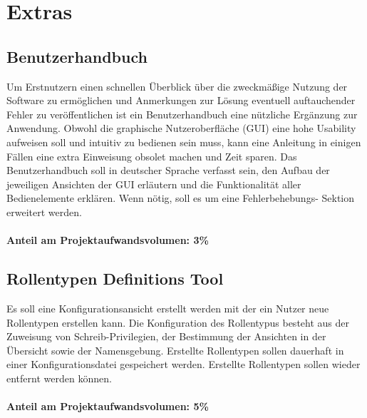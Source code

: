 \section{Extras}
    \subsection{Benutzerhandbuch}

    Um Erstnutzern einen schnellen Überblick über die zweckmäßige Nutzung der
    Software zu ermöglichen und Anmerkungen zur Lösung eventuell auftauchender
    Fehler zu veröffentlichen ist ein Benutzerhandbuch eine nützliche Ergänzung
    zur Anwendung. Obwohl die graphische Nutzeroberfläche (GUI) eine hohe
    Usability aufweisen soll und intuitiv zu bedienen sein muss, kann eine
    Anleitung in einigen Fällen eine extra Einweisung obsolet machen und Zeit
    sparen. Das Benutzerhandbuch soll in deutscher Sprache verfasst sein, den
    Aufbau der jeweiligen Ansichten der GUI erläutern und die Funktionalität
    aller Bedienelemente erklären. Wenn nötig, soll es um eine Fehlerbehebungs-
    Sektion erweitert werden.\\
    \\
    \textbf{Anteil am Projektaufwandsvolumen: 3\%}


    \subsection{Rollentypen Definitions Tool}

    Es soll eine Konfigurationsansicht erstellt werden mit der ein Nutzer neue 
    Rollentypen erstellen kann. Die Konfiguration des Rollentypus besteht aus
    der Zuweisung von Schreib-Privilegien, der Bestimmung der Ansichten in der
    Übersicht sowie der Namensgebung. Erstellte Rollentypen sollen dauerhaft in
    einer Konfigurationsdatei gespeichert werden. Erstellte Rollentypen sollen 
    wieder entfernt werden können.\\
    \\
    \textbf{Anteil am Projektaufwandsvolumen: 5\%}